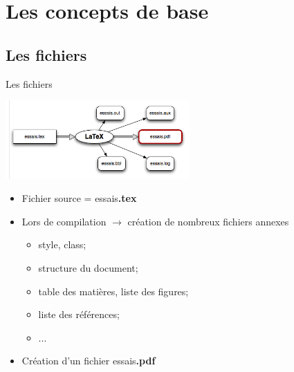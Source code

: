 \documentclass[10pt,svgnames,usenames,table]{beamer} %
\begin{document}
\section{Les concepts de base}
\subsection{Les fichiers}

\begin{frame}{Les fichiers}

	\begin{center}
		\includegraphics[height=3cm]{compilation.jpg}
	\end{center}

	\begin{itemize}
		\item Fichier source  = essais\alert{\textbf{.tex}}
		\item Lors de compilation $\rightarrow$ création de nombreux fichiers annexes
		\begin{itemize}
			\item style, class;
			\item structure du document;
			\item table des matières, liste des figures;
			\item liste des références;
			\item ...
		\end{itemize}
		\item Création d'un fichier essais\alert{\textbf{.pdf}}
	\end{itemize}
\end{frame}
\end{document}
